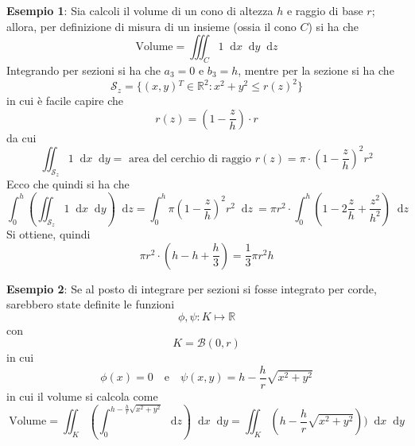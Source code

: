\documentclass[a4paper]{extarticle}
\newcommand*\dif{\mathop{}\!\mathrm{d}}
\begin{document}
\vspace{2em}
\noindent
\textbf{Esempio 1}: Sia calcoli il volume di un cono di altezza $h$ e raggio di base $r$; allora, per definizione di misura di un insieme (ossia il cono $C$) si ha che
\[\text{Volume}=\iiint_C 1 \dif x \dif y \dif z\]
Integrando per sezioni si ha che $a_3=0$ e $b_3=h$, mentre per la sezione si ha che
\[\mathcal{S}_z = \{(x,y){^T} \in \mathbb{R}^2 : x^2+y^2 \leq r(z)^2\}\]
in cui è facile capire che
\[r(z)=\left(1-\dfrac{z}{h}\right) \cdot r\]
da cui
\[\iint_{\mathcal{S}_z} 1 \dif x \dif y = \text{ area del cerchio di raggio } r(z) = \pi \cdot \left(1-\dfrac{z}{h}\right)^2 r^2\]
Ecco che quindi si ha che
\[\int_0^h \left(\iint_{\mathcal{S}_z} 1 \dif x \dif y\right) \dif z = \int_0^h \pi \left(1-\dfrac{z}{h}\right)^2 r^2 \dif z\ = \pi r^2 \cdot \int_0^h \left(1-2\dfrac{z}{h} +\dfrac{z^2}{h^2}\right) \dif z\]
Si ottiene, quindi
\[\pi r^2 \cdot \left(h-h+\dfrac{h}{3} \right) = \dfrac{1}{3} \pi r^2 h\]

\vspace{2em}
\noindent
\textbf{Esempio 2}: Se al posto di integrare per sezioni si fosse integrato per corde, sarebbero state definite le funzioni
\[\phi,\psi : K \longmapsto \mathbb{R}\]
con
\[K=\mathcal{B}(0,r)\]
in cui
\[\phi(x)=0 \hspace{1em} \text{e} \hspace{1em} \psi(x,y) = h - \dfrac{h}{r} \sqrt{x^2+y^2}\]
in cui il volume si calcola come
\[\text{Volume}=\iint_K \left(\int_0^{h-\frac{h}{r} \sqrt{x^2+y^2}} \dif z\right) \dif x \dif y = \iint_K \left(h-\dfrac{h}{r} \sqrt{x^2+y^2}\right)) \dif x \dif y\]

\vspace{1em}
\end{document}
